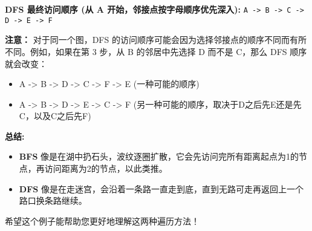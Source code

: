 \textbf{DFS 最终访问顺序 (从 A 开始，邻接点按字母顺序优先深入):} \lstinline{A -> B -> C -> D -> E -> F}

\textbf{注意：} 对于同一个图，DFS 的访问顺序可能会因为选择邻接点的顺序不同而有所不同。例如，如果在第 3 步，从 B 的邻居中先选择 D 而不是 C，那么 DFS 顺序就会改变：

\begin{itemize}
	\item A -> B -> D -> C -> F -> E (一种可能的顺序)
	\item A -> B -> D -> E -> C -> F (另一种可能的顺序，取决于D之后先E还是先C，以及C之后先F)
\end{itemize}

\textbf{总结:}

\begin{itemize}
	\item \textbf{BFS} 像是在湖中扔石头，波纹逐圈扩散，它会先访问完所有距离起点为1的节点，再访问距离为2的节点，以此类推。
	\item \textbf{DFS} 像是在走迷宫，会沿着一条路一直走到底，直到无路可走再返回上一个路口换条路继续。
\end{itemize}

希望这个例子能帮助您更好地理解这两种遍历方法！
